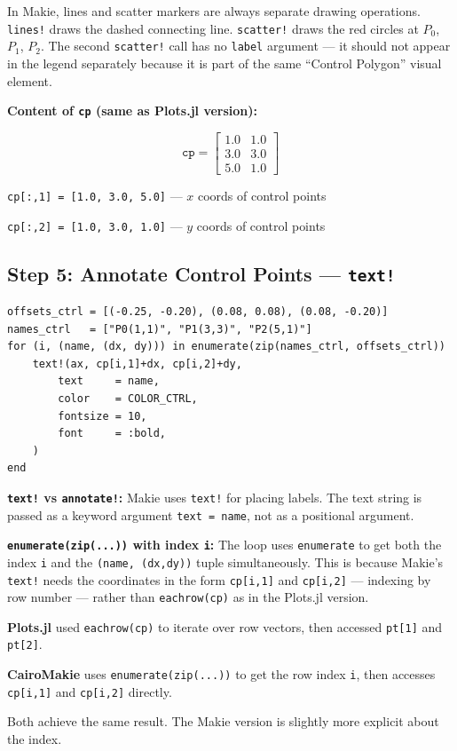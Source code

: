 \documentclass[12pt, a4paper]{article}
\newcommand{\cd}[1]{\texttt{#1}}
\begin{document}
In Makie, lines and scatter markers are always separate
drawing operations.
\cd{lines!} draws the dashed connecting line.
\cd{scatter!} draws the red circles at $P_0$, $P_1$, $P_2$.
The second \cd{scatter!} call has no \cd{label} argument ---
it should not appear in the legend separately because it is
part of the same ``Control Polygon'' visual element.

\begin{examplebox}
\textbf{Content of \cd{cp} (same as Plots.jl version):}

\[
  \cd{cp} =
  \begin{bmatrix}
    1.0 & 1.0 \\
    3.0 & 3.0 \\
    5.0 & 1.0
  \end{bmatrix}
\]

\cd{cp[:,1] = [1.0, 3.0, 5.0]} \quad --- $x$ coords of control points

\cd{cp[:,2] = [1.0, 3.0, 1.0]} \quad --- $y$ coords of control points
\end{examplebox}

\subsection{Step 5: Annotate Control Points --- \texttt{text!}}

\begin{verbatim}
offsets_ctrl = [(-0.25, -0.20), (0.08, 0.08), (0.08, -0.20)]
names_ctrl   = ["P0(1,1)", "P1(3,3)", "P2(5,1)"]
for (i, (name, (dx, dy))) in enumerate(zip(names_ctrl, offsets_ctrl))
    text!(ax, cp[i,1]+dx, cp[i,2]+dy,
        text     = name,
        color    = COLOR_CTRL,
        fontsize = 10,
        font     = :bold,
    )
end
\end{verbatim}

\textbf{\cd{text!} vs \cd{annotate!}:}
Makie uses \cd{text!} for placing labels.
The text string is passed as a keyword argument
\cd{text = name}, not as a positional argument.

\textbf{\cd{enumerate(zip(...))} with index \cd{i}:}
The loop uses \cd{enumerate} to get both the index \cd{i}
and the \cd{(name, (dx,dy))} tuple simultaneously.
This is because Makie's \cd{text!} needs the coordinates
in the form \cd{cp[i,1]} and \cd{cp[i,2]} --- indexing
by row number --- rather than \cd{eachrow(cp)} as in
the Plots.jl version.

\begin{diffbox}
\textbf{Plots.jl} used \cd{eachrow(cp)} to iterate over
row vectors, then accessed \cd{pt[1]} and \cd{pt[2]}.

\textbf{CairoMakie} uses \cd{enumerate(zip(...))} to get
the row index \cd{i}, then accesses \cd{cp[i,1]} and
\cd{cp[i,2]} directly.

Both achieve the same result.
The Makie version is slightly more explicit about the index.
\end{diffbox}
\end{document}
